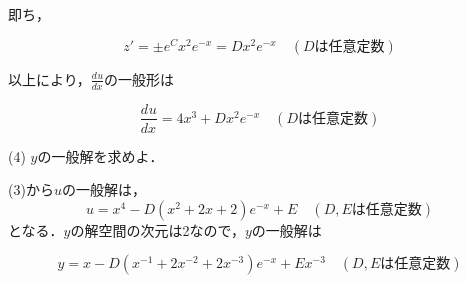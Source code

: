 \documentclass[a4j]{jarticle}
\let \ds \displaystyle
\newcommand{\idiff}[3]{
  \frac{d^{#1} #2}{d #3^{#1}}
}
\begin{document}
即ち，

$$z' = \pm e^C x^2 e^{-x} = Dx^2e^{-x}\quad(D\mbox{は任意定数})$$

以上により，$\ds\idiff{}{u}{x}$の一般形は

$$\idiff{}{u}{x} = 4x^3 + Dx^2e^{-x}\quad(D\mbox{は任意定数}) $$


\begin{screen}
 (4) $y$の一般解を求めよ．
\end{screen}


(3)から$u$の一般解は，
$$u = x^4 -D(x^2+2x+2)e^{-x}+E \quad(D,E\mbox{は任意定数})$$
となる．$y$の解空間の次元は2なので，$y$の一般解は

$$y = x - D(x^{-1}+2x^{-2}+2x^{-3})e^{-x}+ Ex^{-3}\quad(D,E\mbox{は任意定数})$$
\end{document}
